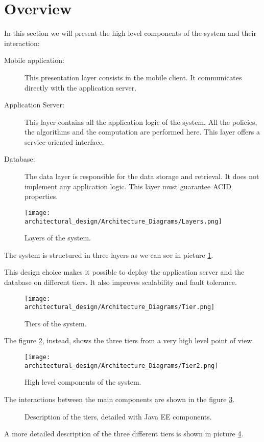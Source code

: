 \section{Overview}
In this section we will present the high level components of the system and their interaction:

\begin{description}
\item[Mobile application:] This presentation layer consists in the mobile client. It communicates directly with the application server.
\item[Application Server:] This layer contains all the application logic of the system. All the policies, the algorithms and the computation are performed here. This layer offers a service-oriented interface.
\item[Database:] The data layer is responsible for the data storage and retrieval. It does not implement any application logic. This layer must guarantee ACID properties. 
\end{description}

\begin{figure}
	\centering
	\texttt{[image: architectural\_design/Architecture\_Diagrams/Layers.png]}
	\caption{Layers of the system.}
	\label{fig:layers}
\end{figure}

The system is structured in three layers as we can see in picture \ref{fig:layers}.

This design choice makes it possible to deploy the application server and the database on different tiers. It also improves scalability and fault tolerance.

\begin{figure}
	\centering
	\texttt{[image: architectural\_design/Architecture\_Diagrams/Tier.png]}
	\caption{Tiers of the system.}
	\label{fig:tiers}
\end{figure}

The figure \ref{fig:tiers}, instead, shows the three tiers from a very high level point of view.

\begin{figure}
	\centering
	\texttt{[image: architectural\_design/Architecture\_Diagrams/Tier2.png]}
	\caption{High level components of the system.}
	\label{fig:high_components}
\end{figure}

The interactions between the main components are shown in the figure \ref{fig:high_components}.

\begin{figure}
    \vspace*{-2cm}
    \caption{Description of the tiers, detailed with Java EE components.}
	\label{fig:tiers_description}
\end{figure}

A more detailed description of the three different tiers is shown in picture \ref{fig:tiers_description}.


